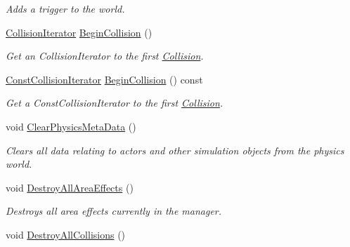 \begin{DoxyCompactItemize}
\begin{DoxyCompactList}\small\item\em Adds a trigger to the world. \item\end{DoxyCompactList}\item 
\hyperlink{classMezzanine_1_1PhysicsManager_a8d2fa60cdfdc7997a09cb8a3434371af}{CollisionIterator} \hyperlink{classMezzanine_1_1PhysicsManager_ae7dd5afd48cb25dc72807f7a5a0efc0b}{BeginCollision} ()
\begin{DoxyCompactList}\small\item\em Get an CollisionIterator to the first \hyperlink{classMezzanine_1_1Collision}{Collision}. \item\end{DoxyCompactList}\item 
\hyperlink{classMezzanine_1_1PhysicsManager_a667151fe9525d7f3f174ad55a499065f}{ConstCollisionIterator} \hyperlink{classMezzanine_1_1PhysicsManager_ac05c8da294e6556d1e07bffc954005a6}{BeginCollision} () const 
\begin{DoxyCompactList}\small\item\em Get a ConstCollisionIterator to the first \hyperlink{classMezzanine_1_1Collision}{Collision}. \item\end{DoxyCompactList}\item 
void \hyperlink{classMezzanine_1_1PhysicsManager_a82fc7833487bbc792a671b032cfd7a6b}{ClearPhysicsMetaData} ()
\begin{DoxyCompactList}\small\item\em Clears all data relating to actors and other simulation objects from the physics world. \item\end{DoxyCompactList}\item 
\hypertarget{classMezzanine_1_1PhysicsManager_ad1717a3bbf093c82909bc4af70641c7c}{
void \hyperlink{classMezzanine_1_1PhysicsManager_ad1717a3bbf093c82909bc4af70641c7c}{DestroyAllAreaEffects} ()}
\label{classMezzanine_1_1PhysicsManager_ad1717a3bbf093c82909bc4af70641c7c}

\begin{DoxyCompactList}\small\item\em Destroys all area effects currently in the manager. \item\end{DoxyCompactList}\item 
\hypertarget{classMezzanine_1_1PhysicsManager_a8a34856cf8da8448c5f148100163a995}{
void \hyperlink{classMezzanine_1_1PhysicsManager_a8a34856cf8da8448c5f148100163a995}{DestroyAllCollisions} ()}
\label{classMezzanine_1_1PhysicsManager_a8a34856cf8da8448c5f148100163a995}


\end{DoxyCompactItemize}
